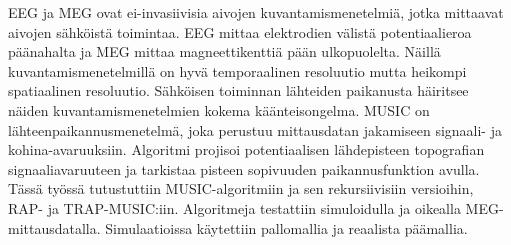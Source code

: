 EEG ja MEG ovat ei-invasiivisia aivojen kuvantamismenetelmiä, jotka mittaavat aivojen sähköistä toimintaa. EEG mittaa elektrodien välistä potentiaalieroa päänahalta ja MEG mittaa magneettikenttiä pään ulkopuolelta. Näillä kuvantamismenetelmillä on hyvä temporaalinen resoluutio mutta heikompi spatiaalinen resoluutio. Sähköisen toiminnan lähteiden paikanusta häiritsee näiden kuvantamismenetelmien kokema käänteisongelma. MUSIC on lähteenpaikannusmenetelmä, joka perustuu mittausdatan jakamiseen signaali- ja kohina-avaruuksiin. Algoritmi projisoi potentiaalisen lähdepisteen topografian signaaliavaruuteen ja tarkistaa pisteen sopivuuden paikannusfunktion avulla. Tässä työssä tutustuttiin MUSIC-algoritmiin ja sen rekursiivisiin versioihin, RAP- ja TRAP-MUSIC:iin. Algoritmeja testattiin simuloidulla ja oikealla MEG-mittausdatalla. Simulaatioissa käytettiin pallomallia ja reaalista päämallia.